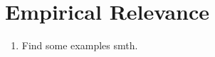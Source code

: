 
\section{Empirical Relevance}
\label{sec:empirical-relevance}  

\begin{enumerate}
    \item
    Find some examples smth.
\end{enumerate}

